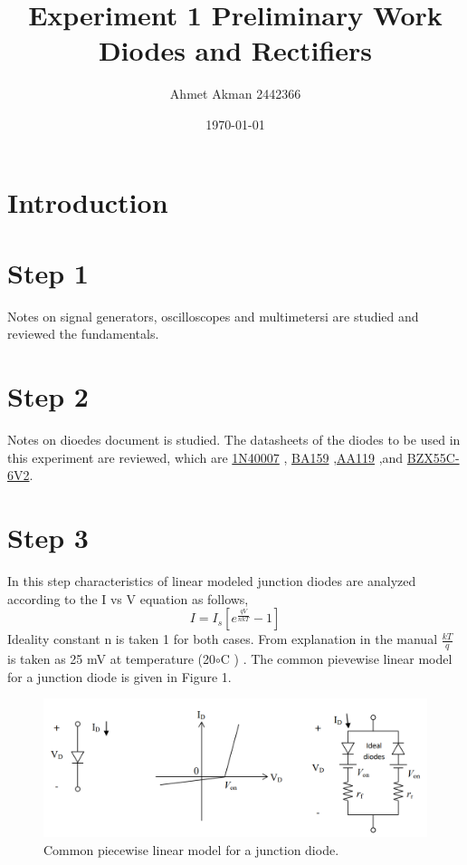 \documentclass[letterpaper,12pt]{article}
\begin{document}
\title{Experiment 1 Preliminary Work \protect\\ Diodes and Rectifiers}
\author{Ahmet Akman 2442366 \protect\\}
\date{\today}
\maketitle
\tableofcontents

\section{Introduction} 
\section{Step 1}
Notes on signal generators, oscilloscopes and multimetersi are studied and reviewed the fundamentals.
\section{Step 2}
Notes on dioedes document is studied. The datasheets of the diodes to be used in this experiment are reviewed, which are \href{https://www.vishay.com/docs/88503/1n4001.pdf}{1N40007} , \href{https://www.vishay.com/docs/88536/ba157.pdf}{BA159} ,\href{https://logosfoundation.org/elektron/mixers/AA119.pdf}{AA119} ,and \href{https://www.vishay.com/docs/85604/bzx55.pdf}{BZX55C-6V2}.   
\section{Step 3}
In this step characteristics of linear modeled junction diodes are analyzed according to the I vs V equation as follows,
\[
I  = I_s[e^\frac{qV}{nkT} - 1]    
\] 
Ideality constant n is taken 1 for both cases. From explanation in the manual \(\frac{kT}{q}\) is taken as 25 mV at temperature (20\(\circ\)C ) . The common pievewise linear model for a junction diode is given in Figure 1.
\begin{figure}[H]
    \centering
   \includegraphics[width=1\textwidth]{3_1.png}
   \caption{Common piecewise linear model for a junction diode.}
\end{figure} 
\end{document}
